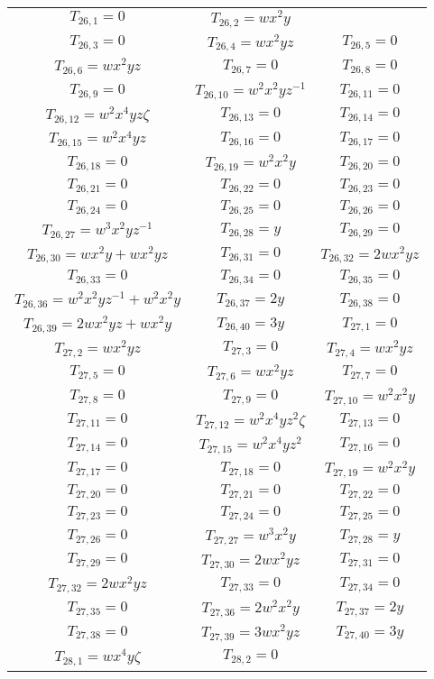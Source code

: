 \documentclass[12pt]{memoireuqam1.3}
\begin{document}
\begin{longtable}{|c|c|c|}
$T_{26,1}= 0$&
$T_{26,2}= wx^2y$\\
$T_{26,3}= 0$&
$T_{26,4}= wx^2yz$&
$T_{26,5}= 0$\\
$T_{26,6}= wx^2yz$&
$T_{26,7}= 0$&
$T_{26,8}= 0$\\
$T_{26,9}= 0$&
$T_{26,10}= w^2x^2yz^{-1}$&
$T_{26,11}= 0$\\
$T_{26,12}= w^2x^4yz\zeta$&
$T_{26,13}= 0$&
$T_{26,14}= 0$\\
$T_{26,15}= w^2x^4yz$&
$T_{26,16}= 0$&
$T_{26,17}= 0$\\
$T_{26,18}= 0$&
$T_{26,19}= w^2x^2y$&
$T_{26,20}= 0$\\
$T_{26,21}= 0$&
$T_{26,22}= 0$&
$T_{26,23}= 0$\\
$T_{26,24}= 0$&
$T_{26,25}= 0$&
$T_{26,26}= 0$\\
$T_{26,27}= w^3x^2yz^{-1}$&
$T_{26,28}= y$&
$T_{26,29}= 0$\\
$T_{26,30}= wx^2y+wx^2yz$&
$T_{26,31}= 0$&
$T_{26,32}= 2wx^2yz$\\
$T_{26,33}= 0$&
$T_{26,34}= 0$&
$T_{26,35}= 0$\\
$T_{26,36}= w^2x^2yz^{-1}+w^2x^2y$&
$T_{26,37}= 2y$&
$T_{26,38}= 0$\\
$T_{26,39}= 2wx^2yz+wx^2y$&
$T_{26,40}= 3y$&
$T_{27,1}= 0$\\
$T_{27,2}= wx^2yz$&
$T_{27,3}= 0$&
$T_{27,4}= wx^2yz$\\
$T_{27,5}= 0$&
$T_{27,6}= wx^2yz$&
$T_{27,7}= 0$\\
$T_{27,8}= 0$&
$T_{27,9}= 0$&
$T_{27,10}= w^2x^2y$\\
$T_{27,11}= 0$&
$T_{27,12}= w^2x^4yz^2\zeta$&
$T_{27,13}= 0$\\
$T_{27,14}= 0$&
$T_{27,15}= w^2x^4yz^2$&
$T_{27,16}= 0$\\
$T_{27,17}= 0$&
$T_{27,18}= 0$&
$T_{27,19}= w^2x^2y$\\
$T_{27,20}= 0$&
$T_{27,21}= 0$&
$T_{27,22}= 0$\\
$T_{27,23}= 0$&
$T_{27,24}= 0$&
$T_{27,25}= 0$\\
$T_{27,26}= 0$&
$T_{27,27}= w^3x^2y$&
$T_{27,28}= y$\\
$T_{27,29}= 0$&
$T_{27,30}= 2wx^2yz$&
$T_{27,31}= 0$\\
$T_{27,32}= 2wx^2yz$&
$T_{27,33}= 0$&
$T_{27,34}= 0$\\
$T_{27,35}= 0$&
$T_{27,36}= 2w^2x^2y$&
$T_{27,37}= 2y$\\
$T_{27,38}= 0$&
$T_{27,39}= 3wx^2yz$&
$T_{27,40}= 3y$\\
$T_{28,1}= wx^4y\zeta$&
$T_{28,2}= 0$&

\end{longtable}
\end{document}
